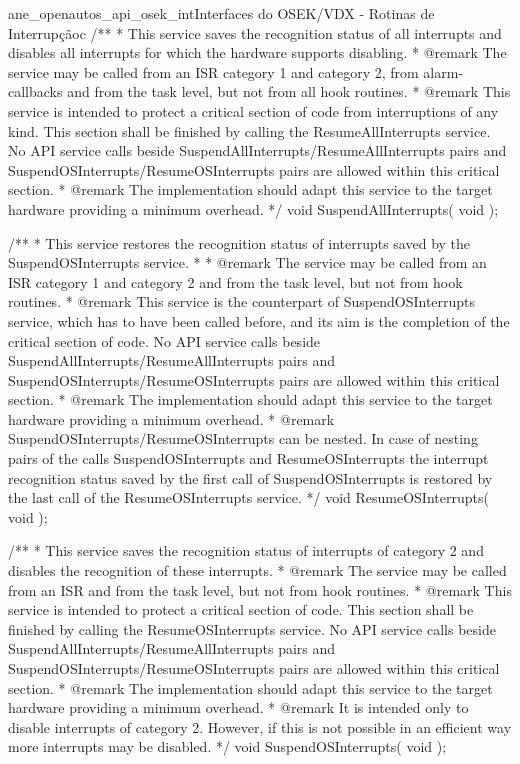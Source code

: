 \begin{algoritmo}{ane_openautos_api_osek_int}{Interfaces do OSEK/VDX - Rotinas de Interrupção}{c}
/**
* This service saves the recognition status of all interrupts and disables all interrupts for which the hardware supports disabling.
* @remark The service may be called from an ISR category 1 and category 2, from alarm-callbacks and from the task level, but not from all hook routines.
* @remark This service is intended to protect a critical section of code from interruptions of any kind. This section shall be finished by calling the ResumeAllInterrupts service. No API service calls beside SuspendAllInterrupts/ResumeAllInterrupts pairs and SuspendOSInterrupts/ResumeOSInterrupts pairs are allowed within this critical section.
* @remark The implementation should adapt this service to the target hardware providing a minimum overhead.
*/
void SuspendAllInterrupts( void );

/**
* This service restores the recognition status of interrupts saved by the SuspendOSInterrupts service.
* 
* @remark The service may be called from an ISR category 1 and category 2 and from the task level, but not from hook routines.
* @remark This service is the counterpart of SuspendOSInterrupts service, which has to have been called before, and its aim is the completion of the critical section of code. No API service calls beside SuspendAllInterrupts/ResumeAllInterrupts pairs and SuspendOSInterrupts/ResumeOSInterrupts pairs are allowed within this critical section.
* @remark The implementation should adapt this service to the target hardware providing a minimum overhead.
* @remark SuspendOSInterrupts/ResumeOSInterrupts can be nested. In case of nesting pairs of the calls SuspendOSInterrupts and ResumeOSInterrupts the interrupt recognition status saved by the first call of SuspendOSInterrupts is restored by the last call of the ResumeOSInterrupts service.
*/
void ResumeOSInterrupts( void );

/**
* This service saves the recognition status of interrupts of category 2 and disables the recognition of these interrupts.
* @remark The service may be called from an ISR and from the task level, but not from hook routines.
* @remark This service is intended to protect a critical section of code. This section shall be finished by calling the ResumeOSInterrupts service. No API service calls beside SuspendAllInterrupts/ResumeAllInterrupts pairs and SuspendOSInterrupts/ResumeOSInterrupts pairs are allowed within this critical section.
* @remark The implementation should adapt this service to the target hardware providing a minimum overhead.
* @remark It is intended only to disable interrupts of category 2. However, if this is not possible in an efficient way more interrupts may be disabled.
*/
void SuspendOSInterrupts( void );
\end{algoritmo}

